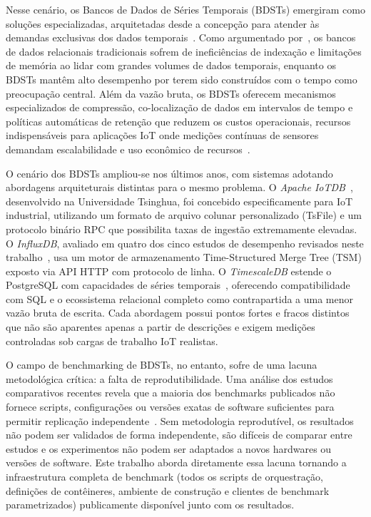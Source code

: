Nesse cenário, os Bancos de Dados de Séries Temporais (BDSTs) emergiram como soluções
especializadas, arquitetadas desde a concepção para atender às demandas exclusivas dos dados
temporais~\citep{InfluxDataTimeSeries}. Como argumentado por~\cite{naqvi2017influxdb}, os
bancos de dados relacionais tradicionais sofrem de ineficiências de indexação e limitações de
memória ao lidar com grandes volumes de dados temporais, enquanto os BDSTs mantêm alto
desempenho por terem sido construídos com o tempo como preocupação central. Além da vazão
bruta, os BDSTs oferecem mecanismos especializados de compressão, co-localização de dados em
intervalos de tempo e políticas automáticas de retenção que reduzem os custos operacionais,
recursos indispensáveis para aplicações IoT onde medições contínuas de sensores demandam
escalabilidade e uso econômico de recursos~\citep{Dunning2014}.

O cenário dos BDSTs ampliou-se nos últimos anos, com sistemas adotando abordagens
arquiteturais distintas para o mesmo problema.
O \textit{Apache IoTDB}~\cite{wang2023iotdb}, desenvolvido na Universidade Tsinghua, foi
concebido especificamente para IoT industrial, utilizando um formato de arquivo colunar
personalizado (TsFile) e um protocolo binário RPC que possibilita taxas de ingestão
extremamente elevadas. O \textit{InfluxDB}, avaliado em quatro dos cinco estudos de desempenho revisados neste
trabalho~\citep{naqvi2017influxdb,shah2022performance,lima2024avaliando,wang2023iotdb}, usa
um motor de armazenamento Time-Structured Merge Tree (TSM) exposto via API HTTP com
protocolo de linha. O \textit{TimescaleDB} estende o PostgreSQL com capacidades de séries
temporais~\citep{Ramakrishnan2003}, oferecendo compatibilidade com SQL e o ecossistema
relacional completo como contrapartida a uma menor vazão bruta de escrita. Cada abordagem
possui pontos fortes e fracos distintos que não são aparentes apenas a partir de descrições
e exigem medições controladas sob cargas de trabalho IoT realistas.

O campo de benchmarking de BDSTs, no entanto, sofre de uma lacuna metodológica crítica: a
falta de reprodutibilidade. Uma análise dos estudos comparativos recentes revela que a maioria
dos benchmarks publicados não fornece scripts, configurações ou versões exatas de software
suficientes para permitir replicação independente~\citep{pereira2023mulletbench,shah2022performance,naqvi2017influxdb}.
Sem metodologia reprodutível, os resultados não podem ser validados de forma independente,
são difíceis de comparar entre estudos e os experimentos não podem ser adaptados a novos
hardwares ou versões de software. Este trabalho aborda diretamente essa lacuna tornando a
infraestrutura completa de benchmark (todos os scripts de orquestração, definições de
contêineres, ambiente de construção e clientes de benchmark parametrizados)
publicamente disponível junto com os resultados.

